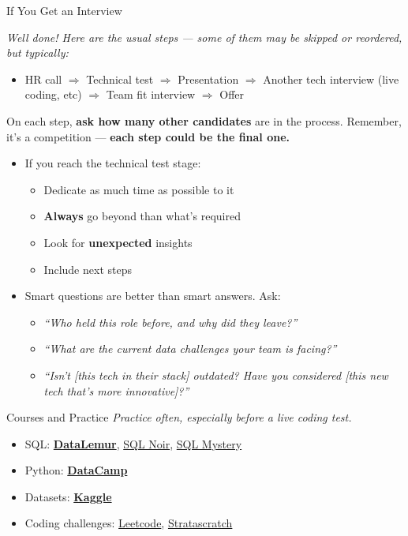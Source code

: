 \documentclass[10pt,a4paper]{article}
\begin{document}
\begin{multicols}{3}
\begin{textboxGreen}{If You Get an Interview}

\textit{Well done! Here are the usual steps — some of them may be skipped or reordered, but typically:}

\begin{itemize}
    \item HR call $\Rightarrow$ Technical test $\Rightarrow$ Presentation $\Rightarrow$ Another tech interview (live coding, etc) $\Rightarrow$ Team fit interview $\Rightarrow$ Offer
  \end{itemize}

On each step, \textbf{ask how many other candidates} are in the process. Remember, it’s a competition — \textbf{each step could be the final one.}
\begin{itemize}    
\item If you reach the technical test stage:
  \begin{itemize}
    \item  Dedicate as much time as possible to it
    \item \textbf{Always} go beyond than what’s required
    \item Look for \textbf{unexpected} insights 
    \item Include next steps
  \end{itemize}
  \item Smart questions are better than smart answers. Ask:
  \begin{itemize}
    \item \textit{“Who held this role before, and why did they leave?”}
    \item \textit{“What are the current data challenges your team is facing?”}
    \item \textit{“Isn’t [this tech in their stack] outdated? Have you considered [this new tech that’s more innovative]?”}
  \end{itemize}
\end{itemize}

\end{textboxGreen}

\begin{textboxYellow}{Courses and Practice}
\emph{Practice often, especially before a live coding test.}

\begin{itemize}
    \item SQL: \href{https://datalemur.com/}{\textbf{DataLemur}}, \href{https://www.sqlnoir.com/}{SQL Noir}, \href{https://mystery.knightlab.com/}{SQL Mystery}
    \item Python: \href{https://datacamp.com/}{\textbf{DataCamp}}
    \item Datasets: \href{https://www.kaggle.com/}{\textbf{Kaggle}}
    \item Coding challenges: \href{https://leetcode.com/}{Leetcode}, \href{https://www.stratascratch.com/}{Stratascratch}
\end{itemize}
\end{textboxYellow}


\end{multicols}
\end{document}
